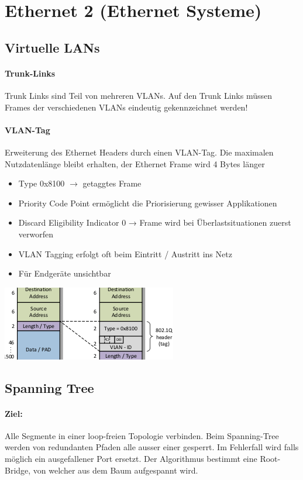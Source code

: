 \newpage
\section{Ethernet 2 (Ethernet Systeme)}

\subsection{Virtuelle LANs}

\paragraph{Trunk-Links} Trunk Links sind Teil von mehreren VLANs. Auf den Trunk Links müssen Frames der verschiedenen VLANs eindeutig gekennzeichnet werden!

\paragraph{VLAN-Tag} Erweiterung des Ethernet Headers durch einen
VLAN-Tag.
Die maximalen Nutzdatenlänge bleibt erhalten,
der Ethernet Frame wird 4 Bytes länger
{
\begin{itemize}[noitemsep]
    \item Type 0x8100 $\to$ getaggtes Frame
    \item Priority Code Point ermöglicht die Priorisierung gewisser Applikationen
    \item Discard Eligibility Indicator 0 → Frame wird bei Überlastsituationen zuerst verworfen
    \item VLAN Tagging erfolgt oft beim Eintritt / Austritt ins Netz
    \item  Für Endgeräte unsichtbar
\end{itemize}
\includegraphics[scale=.75]{img/vlan.png}
\WhiteSpace
}

\subsection{Spanning Tree}

{\paragraph{Ziel:}  Alle Segmente in einer loop-freien Topologie verbinden.
    Beim Spanning-Tree werden von redundanten Pfaden alle ausser einer gesperrt. Im Fehlerfall wird falls möglich ein ausgefallener Port ersetzt.
    Der Algorithmus bestimmt eine Root-Bridge, von welcher aus dem Baum aufgespannt wird.}

